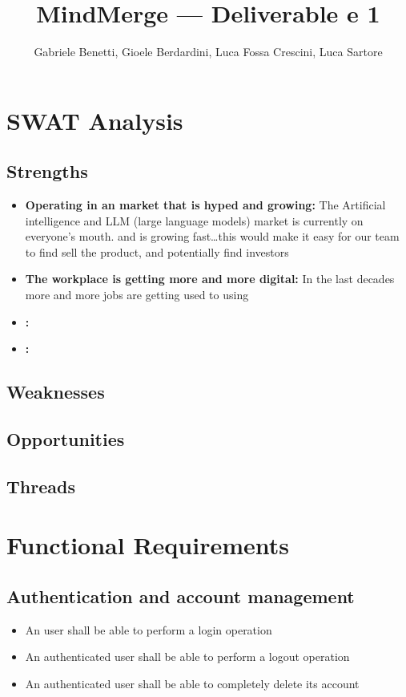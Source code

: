 \documentclass{article}
\title{MindMerge --- Deliverable e 1}
\author{Gabriele Benetti, Gioele Berdardini, Luca Fossa Crescini, Luca Sartore}
\begin{document}
\maketitle


\tableofcontents

\section{SWAT Analysis}
\subsection{Strengths}
\begin{itemize}
    \item \textbf{Operating in an market that is hyped and growing: }
          The Artificial intelligence and LLM (large language models) market is currently on everyone's mouth.
          and is growing fast\dots this would make it easy for our team to find sell the product, and potentially find investors

    \item \textbf{The workplace is getting more and more digital: }
          In the last decades more and more jobs are getting used to using

    \item \textbf{: }
    \item \textbf{: }


\end{itemize}
\subsection{Weaknesses}

\subsection{Opportunities}

\subsection{Threads}

\section{Functional Requirements}
\subsection{Authentication and account management}
\begin{itemize}
    \item An user shall be able to perform a login operation
    \item An authenticated user shall be able to perform a logout operation
    \item An authenticated user shall be able to completely delete its account
\end{itemize}
\end{document}
